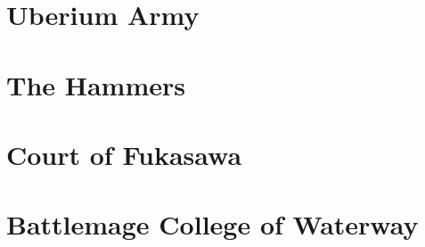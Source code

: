 



\frontmatter
\maketitle
\tableofcontents

\mainmatter%
\section{Uberium Army}
\vspace{4mm}

\clearpage\section{The Hammers}
\vspace{4mm}

\clearpage\section{Court of Fukasawa}
\vspace{4mm}

\clearpage\section{Battlemage College of Waterway}
\vspace{4mm}

